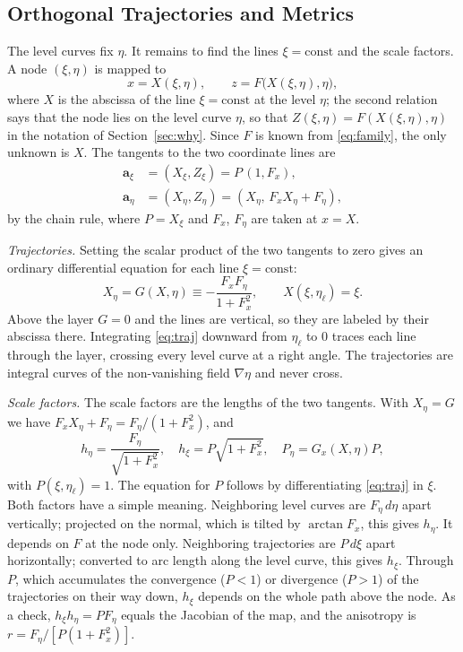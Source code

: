 \documentclass[journal]{IEEEtran}
\newcommand{\etal}{\eta_{\ell}}
\begin{document}
\subsection{Orthogonal Trajectories and Metrics}
The level curves fix $\eta$. It remains to find the lines $\xi=\text{const}$
and the scale factors. A node $(\xi,\eta)$ is mapped to
\begin{equation*}
x=X(\xi,\eta),\qquad z=F\big(X(\xi,\eta),\eta\big),
\end{equation*}
where $X$ is the abscissa of the line $\xi=\text{const}$ at the level $\eta$;
the second relation says that the node lies on the level curve $\eta$, so that
$Z(\xi,\eta)=F(X(\xi,\eta),\eta)$ in the notation of Section~\ref{sec:why}. Since
$F$ is known from \eqref{eq:family}, the only unknown is $X$. The tangents to
the two coordinate lines are
\begin{align*}
\mathbf a_\xi&=(X_\xi,Z_\xi)=P\,(1,F_x),\\
\mathbf a_\eta&=(X_\eta,Z_\eta)=(X_\eta,\,F_xX_\eta+F_\eta),
\end{align*}
by the chain rule, where $P=X_\xi$ and $F_x$, $F_\eta$ are taken at $x=X$.

\emph{Trajectories.} Setting the scalar product of the two tangents to zero
gives an ordinary differential equation for each line $\xi=\text{const}$:
\begin{equation}\label{eq:traj}
X_\eta=G(X,\eta)\equiv-\frac{F_xF_\eta}{1+F_x^2},\qquad X(\xi,\etal)=\xi .
\end{equation}
Above the layer $G=0$ and the lines are vertical, so they are labeled by their
abscissa there. Integrating \eqref{eq:traj} downward from $\etal$ to $0$ traces
each line through the layer, crossing every level curve at a right angle. The
trajectories are integral curves of the non-vanishing field $\nabla\eta$ and
never cross.

\emph{Scale factors.} The scale factors are the lengths of the two tangents.
With $X_\eta=G$ we have $F_xX_\eta+F_\eta=F_\eta/(1+F_x^2)$, and
\begin{equation}\label{eq:metric}
h_\eta=\frac{F_\eta}{\sqrt{1+F_x^2}},\quad h_\xi=P\sqrt{1+F_x^2},\quad
P_\eta=G_x(X,\eta)P,
\end{equation}
with $P(\xi,\etal)=1$. The equation for $P$ follows by differentiating
\eqref{eq:traj} in $\xi$. Both factors have a simple meaning. Neighboring level
curves are $F_\eta\,d\eta$ apart vertically; projected on the normal, which is
tilted by $\arctan F_x$, this gives $h_\eta$. It depends on $F$ at the node
only. Neighboring trajectories are $P\,d\xi$ apart horizontally; converted to
arc length along the level curve, this gives $h_\xi$. Through $P$, which
accumulates the convergence ($P<1$) or divergence ($P>1$) of the trajectories
on their way down, $h_\xi$ depends on the whole path above the node. As a
check, $h_\xi h_\eta=PF_\eta$ equals the Jacobian of the map, and the
anisotropy is $r=F_\eta/[P(1+F_x^2)]$.
\end{document}
